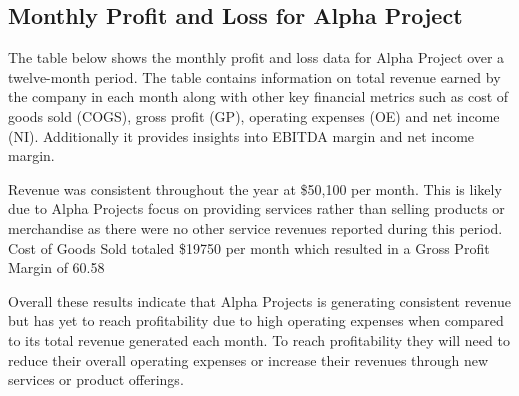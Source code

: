 

\subsection{Monthly Profit and Loss for Alpha Project}\label{sec:title}


The table below shows the monthly profit and loss data for Alpha Project over a twelve-month period. The table contains information on total revenue earned by the company in each month along with other key financial metrics such as cost of goods sold (COGS), gross profit (GP), operating expenses (OE) and net income (NI). Additionally it provides insights into EBITDA margin and net income margin. 

Revenue was consistent throughout the year at \$50,100 per month. This is likely due to Alpha Projects focus on providing services rather than selling products or merchandise as there were no other service revenues reported during this period. Cost of Goods Sold totaled \$19750 per month which resulted in a Gross Profit Margin of 60.58%

 Overall these results indicate that Alpha Projects is generating consistent revenue but has yet to reach profitability due to high operating expenses when compared to its total revenue generated each month. To reach profitability they will need to reduce their overall operating expenses or increase their revenues through new services or product offerings.